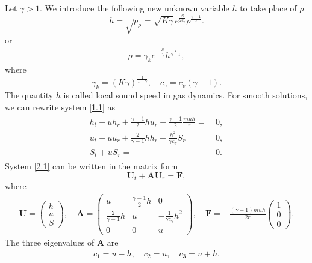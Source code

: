 \documentclass[11pt,reqno]{article}
\newcommand{\fr}{\frac}
\numberwithin{equation}{section}
\begin{document}
Let $\gamma>1$. We introduce the following new unknown variable $h$ to take place of $\rho$
$$
h=\sqrt{p_\rho}=\sqrt{K\gamma}\,e^{\frac{S}{2c_v}}\rho^\frac{\gamma-1}{2}.
$$
or
\begin{align}\label{a1}
\rho=\gamma_k e^{-\fr{S}{c_\gamma}}h^{\fr{2}{\gamma-1}},
\end{align}
where
$$
\gamma_k=(K\gamma)^{\fr{1}{1-\gamma}},\quad c_\gamma=c_v(\gamma-1).
$$
The quantity $h$ is called local sound speed in gas dynamics. For smooth solutions, we can rewrite system \eqref{1.1} as
\begin{align}\label{2.1}
\begin{split}
h_t+uh_r+\fr{\gamma-1}{2}hu_r+\fr{\gamma-1}{2}\frac{m uh}{r}=&\ 0, \\
u_t+uu_r+\fr{2}{\gamma-1}hh_r-\fr{h^2}{\gamma c_\gamma}S_r=&\ 0, \\
S_t+uS_r=&\ 0.
\end{split}
\end{align}
System \eqref{2.1} can be written in the matrix form
$$
\textbf{U}_t+\textbf{A}\textbf{U}_r=\textbf{F},
$$
where
\begin{align*}
\textbf{U}=
\left(
\begin{array}{c}
h \\
u \\
S
\end{array}
\right),\quad
\textbf{A}=
\left(
\begin{array}{ccc}
u  & \fr{\gamma-1}{2}h  &  0 \\
\fr{2}{\gamma-1}h  &  u  &  -\fr{1}{\gamma c_\gamma}h^2 \\
0  &  0  &  u
\end{array}
\right),\quad
\textbf{F}=
-\fr{(\gamma-1)muh}{2r} \left(
\begin{array}{c}
1 \\
0 \\
0
\end{array}
\right).
\end{align*}
The three eigenvalues of $\textbf{A}$ are
\begin{align}\label{2.2}
c_1=u-h,\quad c_2=u, \quad c_3=u+h.
\end{align}
\end{document}
